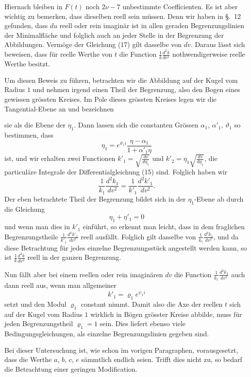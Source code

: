 \documentclass[12pt,a4paper]{article}
\begin{document}
Hiernach bleiben in $F(t)$ noch $2\nu - 7$ unbestimmte Coefficienten. Es ist aber wichtig zu bemerken, dass dieselben reell sein m\"ussen. Denn wir haben in \S.~12 gefunden, dass $du$ reell oder rein imagin\"ar ist in allen geraden Begrenzungslinien der Minimalfl\"ache und folglich auch an jeder Stelle in der Begrenzung der Abbildungen. Verm\"oge der Gleichung (17) gilt dasselbe von $dv$. Daraus l\"asst sich beweisen, dass f\"ur reelle Werthe von $t$ die Function $\frac{1}{k} \frac{d^{2}k}{dv^{2}}$ nothwendigerweise reelle Werthe besitzt.

Um diesen Beweis zu f\"uhren, betrachten wir die Abbildung auf der Kugel vom Radius $1$ und nehmen irgend einen Theil der Begrenzung, also den Bogen eines gewissen gr\"ossten Kreises. Im Pole dieses gr\"ossten Kreises legen wir die Tangential-Ebene an und bezeichnen

\newpage
\noindent sie als die Ebene der $\eta_{1}$. Dann lassen sich die constanten Gr\"ossen $\alpha_{1}$, $\alpha'_{1}$, $\vartheta_{1}$ so bestimmen, dass
\[\eta_{1} = e^{\vartheta_{1}i} \frac{\eta - \alpha_{1}}{1 + \alpha'_{1}\eta}\]
ist, und wir erhalten zwei Functionen $k'_{1} = \sqrt{\frac{dv}{d\eta_{1}}}$ und $k'_{2} = \eta_{1}\sqrt{\frac{dv}{d\eta_{1}}}$, die particul\"are Integrale der Differentialgleichung (15) sind. Folglich haben wir
\[\frac{1}{k_{1}} \frac{d^{2}k_{1}}{dv^{2}} = \frac{1}{k'_{1}} \frac{d^{2}k'_{1}}{dv^{2}}.\]
Der eben betrachtete Theil der Begrenzung bildet sich in der $\eta_{1}$-Ebene ab durch die Gleichung
\[\eta_{1} + \eta'_{1} = 0\]
und wenn man dies in $k'_{1}$ einf\"uhrt, so erkennt man leicht, dass in dem fraglichen Begrenzungstheile $\frac{1}{k'_{1}} \frac{d^{2}k'_{1}}{dv^{2}}$ reell ausf\"allt. Folglich gilt dasselbe von $\frac{1}{k_{1}} \frac{d^{2}k_{1}}{dv^{2}}$, und da diese Betrachtung f\"ur jedes einzelne Begrenzungsst\"uck angestellt werden kann, so ist $\frac{1}{k} \frac{d^{2}k}{dv^{2}}$ reell in der ganzen Begrenzung.

Nun f\"allt aber bei einem reellen oder rein imagin\"aren $dv$ die Function $\frac{1}{k_{1}} \frac{d^{2}k_{1}}{dv^{2}}$ auch dann reell aus, wenn man allgemeiner
\[k'_{1} = \varrho_{1} e^{\psi_{1}i}\]
setzt und den Modul $\varrho_{1}$ constant nimmt. Damit also die Axe der reellen $t$ sich auf der Kugel vom Radius $1$ wirklich in B\"ogen gr\"osster Kreise abbilde, muss f\"ur jeden Begrenzungstheil $\varrho_{1} = 1$ sein. Dies liefert ebenso viele Bedingungsgleichungen, als einzelne Begrenzungslinien gegeben sind.

Bei dieser Untersuchung ist, wie schon im vorigen Paragraphen, vorausgesetzt, dass die Werthe $a$, $b$, $c$, $e$ s\"ammtlich endlich seien. Trifft dies nicht zu, so bedarf die Betrachtung einer geringen Modification.
\end{document}
